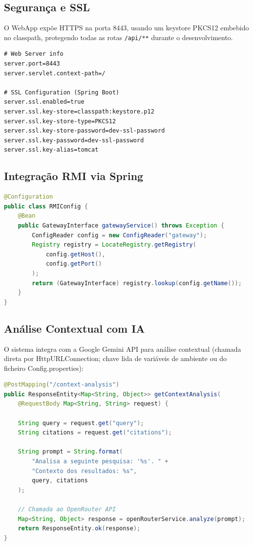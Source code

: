 \documentclass[12pt,a4paper]{article}
\begin{document}
\subsection{Segurança e SSL}
 
O WebApp expõe HTTPS na porta 8443, usando um keystore PKCS12 embebido no classpath, protegendo todas as rotas \texttt{/api/**} durante o desenvolvimento.
 
\begin{lstlisting}[caption={application.properties - SSL}]
# Web Server info
server.port=8443
server.servlet.context-path=/

# SSL Configuration (Spring Boot)
server.ssl.enabled=true
server.ssl.key-store=classpath:keystore.p12
server.ssl.key-store-type=PKCS12
server.ssl.key-store-password=dev-ssl-password
server.ssl.key-password=dev-ssl-password
server.ssl.key-alias=tomcat
\end{lstlisting}


\subsection{Integração RMI via Spring}

\begin{lstlisting}[language=Java, caption={RMIConfig.java - Bean de Gateway}]
@Configuration
public class RMIConfig {
    @Bean
    public GatewayInterface gatewayService() throws Exception {
        ConfigReader config = new ConfigReader("gateway");
        Registry registry = LocateRegistry.getRegistry(
            config.getHost(), 
            config.getPort()
        );
        return (GatewayInterface) registry.lookup(config.getName());
    }
}
\end{lstlisting}

\subsection{Análise Contextual com IA}

O sistema integra com a Google Gemini API para análise contextual (chamada direta por HttpURLConnection; chave lida de variáveis de ambiente ou do ficheiro Config.properties):

\begin{lstlisting}[language=Java, caption={ContextAnalysisController.java}]
@PostMapping("/context-analysis")
public ResponseEntity<Map<String, Object>> getContextAnalysis(
    @RequestBody Map<String, String> request) {
    
    String query = request.get("query");
    String citations = request.get("citations");
    
    String prompt = String.format(
        "Analisa a seguinte pesquisa: '%s'. " +
        "Contexto dos resultados: %s", 
        query, citations
    );
    
    // Chamada ao OpenRouter API
    Map<String, Object> response = openRouterService.analyze(prompt);
    return ResponseEntity.ok(response);
}
\end{lstlisting}
\end{document}
